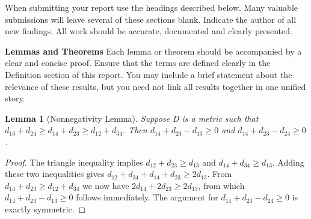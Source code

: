 \documentclass[12pt]{amsart}
\newtheorem{lemma}{Lemma}
\begin{document}
When submitting your report use the headings described below.  Many valuable submissions will leave several of these sections  blank. Indicate the author of all new findings. All work should be accurate,  documented and clearly presented. 

{\large \bf Lemmas and Theorems} 
 Each lemma or theorem should be accompanied by a clear and concise proof. Ensure that the terms are defined clearly in the Definition section of this report. You may include a brief statement about the relevance of these results, but you need not link all results together in one unified story.

\begin{lemma}[Nonnegativity Lemma]
Suppose D is a metric such that $d_{13}+d_{24} \geq d_{14}+d_{23} \geq d_{12}+d_{34}$. Then $d_{14}+d_{23}-d_{13} \geq 0$ and $d_{14}+d_{23}-d_{24} \geq 0$.
\end{lemma}
\begin{proof} The triangle inequality implies $d_{12}+d_{23} \geq d_{13}$ and $d_{14}+d_{34} \geq d_{13}$. Adding these two inequalities gives
$d_{12}+d_{34}+d_{14}+d_{23} \geq 2d_{13}$. From $d_{14}+d_{23} \geq d_{12}+d_{34}$ we now have
$2d_{14}+2d_{23} \geq 2d_{13}$, from which $d_{14}+d_{23}-d_{13} \geq 0$ follows immediately.
The argument for $d_{14}+d_{23}-d_{24} \geq 0$ is exactly symmetric.
\end{proof}
\end{document}
